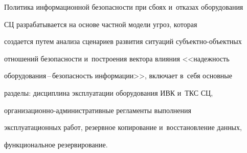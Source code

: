   Политика информационной без\-опас\-ности при сбоях и~отказах оборудования 

СЦ разрабатывается на основе частной модели угроз, которая 

создается путем анализа сценариев развития ситуаций субъ\-ект\-но-объ\-ект\-ных 

отношений без\-опас\-ности и~построения вектора влияния <<на\-деж\-ность  

обору\-до\-ва\-ния\,--\,без\-опас\-ность информации>>, включает в~себя основные 

разделы: дисциплина эксплуатации оборудования ИВК и~ТКС СЦ,  

ор\-га\-ни\-за\-ци\-он\-но-ад\-ми\-нист\-ра\-тив\-ные регламенты выполнения 

эксплуатационных работ, резервное копирование и~восстановление данных, 

функциональное резервирование.

  

